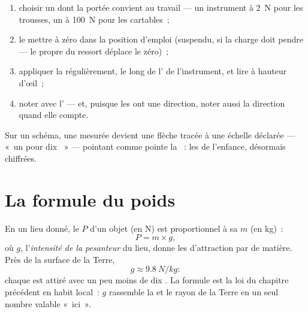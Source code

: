 \begin{method}\label{met:g9:weight-vs-mass:measure}
\begin{enumerate}
  \item choisir un  dont la portée convient au travail
        --- un instrument à \qty{2}{N} pour les trousses, un à
        \qty{100}{N} pour les cartables~;
  \item le mettre à zéro dans la position d'emploi (suspendu, si la
        charge doit pendre --- le  propre du ressort déplace
        le zéro)~;
  \item appliquer la  régulièrement, le long de l' de
        l'instrument, et lire à hauteur d'œil~;
  \item noter avec l' --- et, puisque les  ont une
        direction, noter aussi la direction quand elle compte.
\end{enumerate}
Sur un schéma, une  mesurée devient une flèche tracée à une
échelle déclarée --- «~un  pour dix ~» --- pointant
comme pointe la ~: les  de l'enfance, désormais
chiffrées.
\end{method}

\section{La formule du poids}

\begin{proposition}\label{prop:g9:weight-vs-mass:formula}
En un lieu donné, le  $P$ d'un objet (en \unit{N}) est
proportionnel à sa  $m$ (en \unit{kg})~:
\[
P = m \times g ,
\]
où $g$, l'\emph{intensité de la pesanteur}
du lieu, donne les  d'attraction par  de matière.
Près de la surface de la Terre,
\[
g \approx \qty{9.8}{N/kg}:
\]
chaque  est attiré avec un peu moins de dix . La
formule est la loi du chapitre précédent en habit local~: $g$
rassemble la  et le rayon de la Terre en un seul nombre valable
«~ici~».
\end{proposition}

